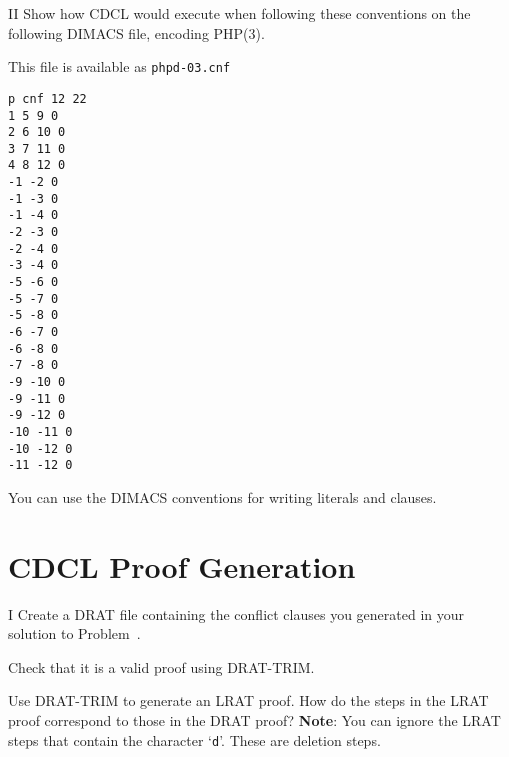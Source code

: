 \begin{problem}{II}
  Show how CDCL would execute when following these conventions on the following
  DIMACS file, encoding PHP(3).

  This file is available as \texttt{phpd-03.cnf}
\begin{lstlisting}
p cnf 12 22
1 5 9 0
2 6 10 0
3 7 11 0
4 8 12 0
-1 -2 0
-1 -3 0
-1 -4 0
-2 -3 0
-2 -4 0
-3 -4 0
-5 -6 0
-5 -7 0
-5 -8 0
-6 -7 0
-6 -8 0
-7 -8 0
-9 -10 0
-9 -11 0
-9 -12 0
-10 -11 0
-10 -12 0
-11 -12 0
\end{lstlisting}
  You can use the DIMACS conventions for writing literals and clauses.
  
\end{problem}

\newpage

\section*{CDCL Proof Generation}


\begin{problem}{I}
Create a DRAT file containing the conflict clauses you generated in your solution to Problem~.
\begin{choice}
\item
Check that it is a valid proof using DRAT-TRIM.
\item
Use DRAT-TRIM to generate an LRAT proof.  How do the steps in the LRAT proof correspond to those in the DRAT proof?
{\bf Note}: You can ignore the LRAT steps that contain the character `\texttt{d}'.  These are deletion steps.
\end{choice}
\end{problem}

